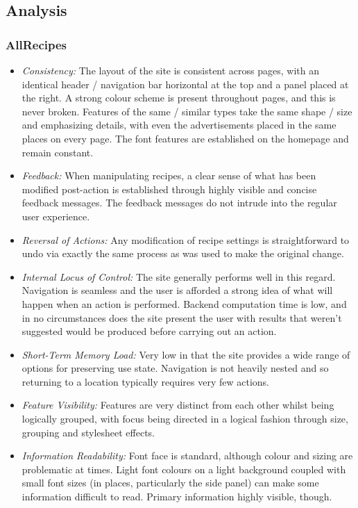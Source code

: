 \documentclass{article}
\begin{document}
\clearpage

\subsection*{Analysis}

\subsubsection*{AllRecipes}
\begin{itemize}
\item \emph{Consistency:} The layout of the site is consistent across pages, with an identical header / navigation bar horizontal at the top and a panel placed at the right. A strong colour scheme is present throughout pages, and this is never broken. Features of the same / similar types take the same shape / size and emphasizing details, with even the advertisements placed in the same places on every page. The font features are established on the homepage and remain constant.
\item \emph{Feedback:} When manipulating recipes, a clear sense of what has been modified post-action is established through highly visible and concise feedback messages. The feedback messages do not intrude into the regular user experience.
\item \emph{Reversal of Actions:} Any modification of recipe settings is straightforward to undo via exactly the same process as was used to make the original change.
\item \emph{Internal Locus of Control: }The site generally performs well in this regard. Navigation is seamless and the user is afforded a strong idea of what will happen when an action is performed. Backend computation time is low, and in no circumstances does the site present the user with results that weren't suggested would be produced before carrying out an action.
\item \emph{Short-Term Memory Load:} Very low in that the site provides a wide range of options for preserving use state. Navigation is not heavily nested and so returning to a location typically requires very few actions.
\item \emph{Feature Visibility:} Features are very distinct from each other whilst being logically grouped, with focus being directed in a logical fashion through size, grouping and stylesheet effects.
\item \emph{Information Readability:} Font face is standard, although colour and sizing are problematic at times. Light font colours on a light background coupled with small font sizes (in places, particularly the side panel) can make some information difficult to read. Primary information highly visible, though.
\end{itemize}
\end{document}
